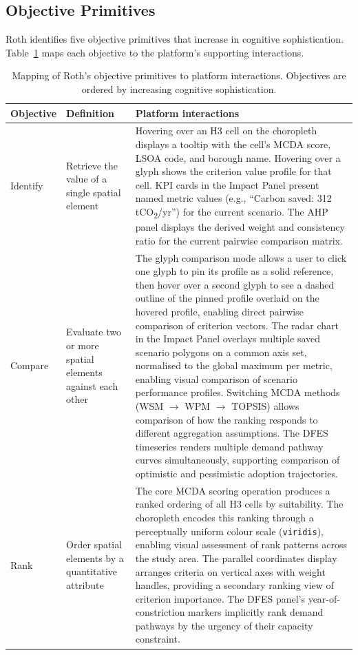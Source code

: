 \subsection{Objective Primitives}
\label{sec:roth-objectives}

Roth identifies five objective primitives that increase in cognitive sophistication. Table~\ref{tab:roth-objectives} maps each objective to the platform's supporting interactions.

\begin{table}[htbp]
\centering
\caption{Mapping of Roth's objective primitives to platform interactions. Objectives are ordered by increasing cognitive sophistication.}
\label{tab:roth-objectives}
\small
\begin{tabular}{p{2.1cm}p{3.2cm}p{10.4cm}}
\toprule
\textbf{Objective} & \textbf{Definition} & \textbf{Platform interactions} \\
\midrule
Identify & Retrieve the value of a single spatial element &
  Hovering over an H3 cell on the choropleth displays a tooltip with the cell's MCDA score, LSOA code, and borough name. Hovering over a glyph shows the criterion value profile for that cell. KPI cards in the Impact Panel present named metric values (e.g., ``Carbon saved: 312 tCO\textsubscript{2}/yr'') for the current scenario. The AHP panel displays the derived weight and consistency ratio for the current pairwise comparison matrix. \\
\addlinespace
Compare & Evaluate two or more spatial elements against each other &
  The glyph comparison mode allows a user to click one glyph to pin its profile as a solid reference, then hover over a second glyph to see a dashed outline of the pinned profile overlaid on the hovered profile, enabling direct pairwise comparison of criterion vectors. The radar chart in the Impact Panel overlays multiple saved scenario polygons on a common axis set, normalised to the global maximum per metric, enabling visual comparison of scenario performance profiles. Switching MCDA methods (WSM $\rightarrow$ WPM $\rightarrow$ TOPSIS) allows comparison of how the ranking responds to different aggregation assumptions. The DFES timeseries renders multiple demand pathway curves simultaneously, supporting comparison of optimistic and pessimistic adoption trajectories. \\
\addlinespace
Rank & Order spatial elements by a quantitative attribute &
  The core MCDA scoring operation produces a ranked ordering of all H3 cells by suitability. The choropleth encodes this ranking through a perceptually uniform colour scale (\texttt{viridis}), enabling visual assessment of rank patterns across the study area. The parallel coordinates display arranges criteria on vertical axes with weight handles, providing a secondary ranking view of criterion importance. The DFES panel's year-of-constriction markers implicitly rank demand pathways by the urgency of their capacity constraint. \\

\end{tabular}
\end{table}
